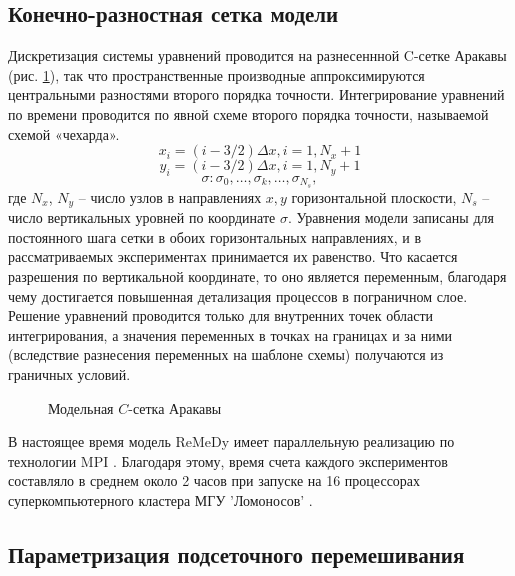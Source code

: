\subsection{Конечно-разностная сетка модели}
\label{sec:model:grid}
Дискретизация системы уравнений проводится на разнесеннной C-сетке Аракавы (рис. \ref{fig:modelgrid}), так что пространственные производные аппроксимируются центральными разностями второго порядка точности. Интегрирование уравнений по времени проводится по явной схеме второго порядка точности, называемой схемой «чехарда».
$$x_i=(i-3/2)\Delta x,i=1,N_x+1$$
$$y_i=(i-3/2)\Delta x,i=1,N_y+1$$
$$\sigma: \sigma_0, \dots, \sigma_k,\dots,\sigma_{N_s},$$
где $N_x$, $N_y$ – число узлов в направлениях $x,y$ горизонтальной плоскости, $N_s$ – число вертикальных уровней по координате $\sigma$. Уравнения модели записаны для постоянного шага сетки в обоих горизонтальных направлениях, и в рассматриваемых экспериментах принимается их равенство. Что касается разрешения по вертикальной координате, то оно является переменным, благодаря чему достигается повышенная детализация процессов в пограничном слое. 
Решение уравнений проводится только для внутренних точек области интегрирования, а значения переменных в точках на границах и за ними (вследствие разнесения переменных на шаблоне схемы) получаются из граничных условий.
\begin{figure}[h]
\begin{center}

\end{center}
\caption{Модельная $C$-сетка Аракавы}
\label{fig:modelgrid}
\end{figure}

В настоящее время модель ReMeDy имеет параллельную реализацию по технологии MPI \citep{StepanenkoMikushin2008}. Благодаря этому, время счета каждого экспериментов составляло в среднем около 2 часов при запуске на 16 процессорах суперкомпьютерного кластера МГУ 'Ломоносов' \citep{VoevodinEtAl2012}.

\subsection{Параметризация подсеточного перемешивания}
\label{sec:model:closure}
